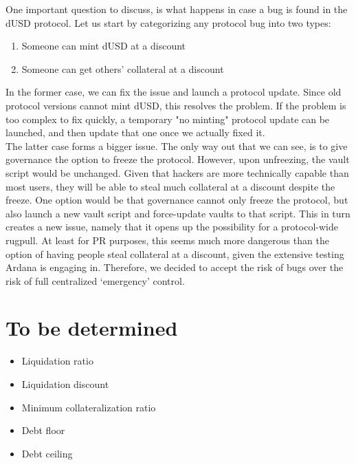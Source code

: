 \documentclass{article} %
\begin{document}
One important question to discuss, is what happens in case a bug is found in the
dUSD protocol. Let us start by categorizing any protocol bug into two types:
\begin{enumerate}
  \item Someone can mint dUSD at a discount
  \item Someone can get others' collateral at a discount
\end{enumerate}

In the former case, we can fix the issue and launch a protocol update. Since old
protocol versions cannot mint dUSD, this resolves the problem.
If the problem is too complex to fix quickly, a temporary "no minting" protocol
update can be launched, and then update that one once we actually fixed it. \\

The latter case forms a bigger issue.
The only way out that we can see, is to give governance the option to freeze the
protocol.
However, upon unfreezing, the vault script would be unchanged.
Given that hackers are more technically capable than most users, they will be
able to steal much collateral at a discount despite the freeze.
One option would be that governance cannot only freeze the protocol, but also
launch a new vault script and force-update vaults to that script.
This in turn creates a new issue, namely that it opens up the possibility for a
protocol-wide rugpull.
At least for PR purposes, this seems much more dangerous than the option of
having people steal collateral at a discount, given the extensive testing Ardana
is engaging in.
Therefore, we decided to accept the risk of bugs over the risk of full
centralized `emergency' control.

\section{To be determined}

\begin{itemize}
  \item Liquidation ratio
  \item Liquidation discount
  \item Minimum collateralization ratio
  \item Debt floor
  \item Debt ceiling
\end{itemize}
\end{document}
